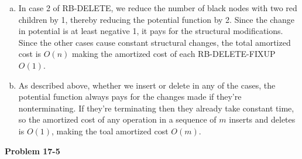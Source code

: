 \documentclass{article}
\begin{document}
\begin{enumerate}[a.]
\item In case 2 of RB-DELETE, we reduce the number of black nodes with two red children by 1, thereby reducing the potential function by 2.  Since the change in potential is at least negative 1, it pays for the structural modifications.  Since the other cases cause constant structural changes, the total amortized cost is $O(n)$ making the amortized cost of each RB-DELETE-FIXUP $O(1)$.\\

\item As described above, whether we insert or delete in any of the cases, the potential function always pays for the changes made if they're nonterminating.  If they're terminating then they already take constant time, so the amortized cost of any operation in a sequence of $m$ inserts and deletes is $O(1)$, making the toal amortized cost $O(m)$. \\
\end{enumerate}

\noindent\textbf{Problem 17-5}\\
\end{document}
